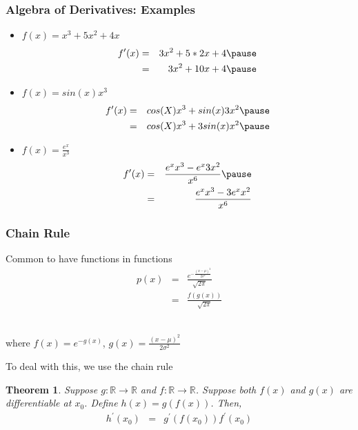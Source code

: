 \documentclass{beamer}
\newtheorem{thm}{Theorem}
\numberwithin{equation}{section}
\begin{document}
\begin{frame}
\frametitle{Algebra of Derivatives: Examples}

\begin{itemize}
\item[1)] $f(x)= x^3 + 5 x^2  + 4 x$ \pause
\begin{eqnarray}
f'(x) & = & 3 x^2 + 5 * 2x + 4 \nonumber \pause \\
      & = & 3 x^2 + 10x + 4 \nonumber \pause
\end{eqnarray}
     
\end{itemize}

\begin{itemize}
\item[2)] $f(x) = sin(x) x^3$ \pause
\begin{eqnarray}
f'(x) & = & cos(X)  x^3 + sin(x)  3 x^2 \nonumber \pause \\
& = & cos(X)  x^3 + 3 sin(x)  x^2 \nonumber \pause
\end{eqnarray}
\end{itemize}

\begin{itemize}
\item[3)] $f(x) = \frac{e^{x} }{x^3}$ \pause
\begin{eqnarray}
f'(x) & = & \frac{e^{x}  x^{3} - e^{x}  3 x^{2} }{x^6} \nonumber \pause \\
& = & \frac{e^{x}  x^{3} - 3 e^{x} x^{2} }{x^6} \nonumber
\end{eqnarray}

\end{itemize}

\end{frame}



\begin{frame}
\frametitle{Chain Rule} 
Common to have functions in functions
\begin{eqnarray}
p(x) & = & \frac{e^{ - \frac{(x - \mu)^2}{2 \sigma^2}}}{\sqrt{2 \pi }  } \nonumber \\
		& = & \frac{f (g(x)) } {\sqrt{2 \pi}} \nonumber 
\end{eqnarray}

\ \\where $f(x) = e ^{- g(x)}$, $g(x) = \frac{(x - \mu)^2}{2 \sigma^2}$ \pause

To deal with this, we use the \alert{chain rule} \pause

\begin{thm} 
Suppose $g: \mathbb{R} \rightarrow \mathbb{R}$ and $f: \mathbb{R} \rightarrow \mathbb{R}$. Suppose both $f(x)$ and $g(x)$ are differentiable at $x_{0}$.  Define $h(x) = g(f(x))$.  Then, 
\begin{eqnarray}
h^{'}(x_{0}) & = & g^{'}(f(x_{0}))f^{'}(x_{0}) \nonumber 
\end{eqnarray}
\end{thm}

\end{frame}
\end{document}
